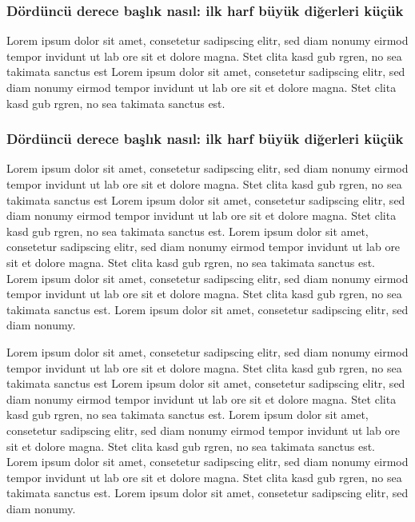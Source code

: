 \subsubsection{Dördüncü derece başlık nasıl: ilk harf büyük diğerleri küçük}
Lorem ipsum dolor sit amet, consetetur sadipscing elitr, sed diam nonumy eirmod tempor invidunt ut lab ore sit et dolore magna. Stet clita kasd gub rgren, no sea takimata sanctus est Lorem ipsum dolor sit amet, consetetur sadipscing elitr, sed diam nonumy eirmod tempor invidunt ut lab ore sit et dolore magna. Stet clita kasd gub rgren, no sea takimata sanctus est.

\subsubsection{Dördüncü derece başlık nasıl: ilk harf büyük diğerleri küçük}
Lorem ipsum dolor sit amet, consetetur sadipscing elitr, sed diam nonumy eirmod tempor invidunt ut lab ore sit et dolore magna. Stet clita kasd gub rgren, no sea takimata sanctus est Lorem ipsum dolor sit amet, consetetur sadipscing elitr, sed diam nonumy eirmod tempor invidunt ut lab ore sit et dolore magna. Stet clita kasd gub rgren, no sea takimata sanctus est. Lorem ipsum dolor sit amet, consetetur sadipscing elitr, sed diam nonumy eirmod tempor invidunt ut lab ore sit et dolore magna. Stet clita kasd gub rgren, no sea takimata sanctus est. Lorem ipsum dolor sit amet, consetetur sadipscing elitr, sed diam nonumy eirmod tempor invidunt ut lab ore sit et dolore magna. Stet clita kasd gub rgren, no sea takimata sanctus est. Lorem ipsum dolor sit amet, consetetur sadipscing elitr, sed diam nonumy.

Lorem ipsum dolor sit amet, consetetur sadipscing elitr, sed diam nonumy eirmod tempor invidunt ut lab ore sit et dolore magna. Stet clita kasd gub rgren, no sea takimata sanctus est Lorem ipsum dolor sit amet, consetetur sadipscing elitr, sed diam nonumy eirmod tempor invidunt ut lab ore sit et dolore magna. Stet clita kasd gub rgren, no sea takimata sanctus est. Lorem ipsum dolor sit amet, consetetur sadipscing elitr, sed diam nonumy eirmod tempor invidunt ut lab ore sit et dolore magna. Stet clita kasd gub rgren, no sea takimata sanctus est. Lorem ipsum dolor sit amet, consetetur sadipscing elitr, sed diam nonumy eirmod tempor invidunt ut lab ore sit et dolore magna. Stet clita kasd gub rgren, no sea takimata sanctus est. Lorem ipsum dolor sit amet, consetetur sadipscing elitr, sed diam nonumy.

